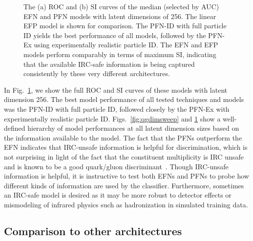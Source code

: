 \documentclass[letterpaper,11pt]{article}
\DeclareRobustCommand{\Fig}[1]{Fig.~\ref{#1}}
\DeclareRobustCommand{\Figs}[2]{Figs.~\ref{#1} and \ref{#2}}
\begin{document}
\begin{figure}[t]
\centering
{}
\caption{The (a) ROC and (b) SI curves of the median (selected by AUC) EFN and PFN models with latent dimensions of 256.
%
The linear EFP model is shown for comparison.
%
The PFN-ID with full particle ID yields the best performance of all models, followed by the PFN-Ex using experimentally realistic particle ID.
%
The EFN and EFP models perform comparably in terms of maximum SI, indicating that the available IRC-safe information is being captured consistently by these very different architectures.}
\label{fig:qgroccomp1}
\end{figure}


In \Fig{fig:qgroccomp1}, we show the full ROC and SI curves of these models with latent dimension 256.
%
The best model performance of all tested techniques and models was the PFN-ID with full particle ID, followed closely by the PFN-Ex with experimentally realistic particle ID.
%
\Figs{fig:qgdimsweep}{fig:qgroccomp1} show a well-defined hierarchy of model performances at all latent dimension sizes based on the information available to the model.
%
The fact that the PFNs outperform the EFN indicates that IRC-unsafe information is helpful for discrimination, which is not surprising in light of the fact that the constituent multiplicity is IRC unsafe and is known to be a good quark/gluon discriminant~\cite{Gallicchio:2012ez}.
%
Though IRC-unsafe information is helpful, it is instructive to test both EFNs and PFNs to probe how different kinds of information are used by the classifier.
%
Furthermore, sometimes an IRC-safe model is desired as it may be more robust to detector effects or mismodeling of infrared physics such as hadronization in simulated training data.


\subsection{Comparison to other architectures}
\label{subsec:compare}
\end{document}
